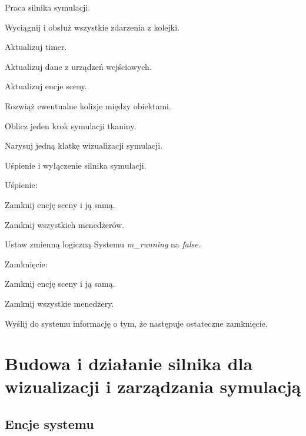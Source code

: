 	\begin{algorithm}
		\label{alg_4_2}
		\caption{Praca silnika symulacji.}	
		
		{
			Wyciągnij i obsłuż wszystkie zdarzenia z kolejki.
			
			{
				Aktualizuj timer.
				
				Aktualizuj dane z urządzeń wejściowych.
				
				Aktualizuj encje sceny.
				
				\Indp
				
				Rozwiąż ewentualne kolizje między obiektami.
				
				Oblicz jeden krok symulacji tkaniny.
				
				\Indm
				
				Narysuj jedną klatkę wizualizacji symulacji.
			}
		}	
	\end{algorithm}
	
	\begin{algorithm}
		\label{alg_4_3}
		\caption{Uśpienie i wyłączenie silnika symulacji.}	
		
		Uśpienie:
		
		\Indp
		
			Zamknij encję sceny i ją samą.
			
			Zamknij wszystkich menedżerów.
			
			Ustaw zmienną logiczną Systemu \emph{m\_running} na \emph{false}.
		
		\Indm
		
		Zamknięcie:
		
		\Indp
		
			Zamknij encję sceny i ją samą.
			
			Zamknij wszystkie menedżery.
			
			Wyślij do systemu informację o tym, że następuje ostateczne zamknięcie.
		
		\Indm
		
	\end{algorithm}
	\newpage
	
	\section{Budowa i działanie silnika dla wizualizacji i zarządzania symulacją}
	\label{t:praktyka:silnik}
	
		\subsection{Encje systemu}
		\label{t:praktyka:silnik:komponent}
		
